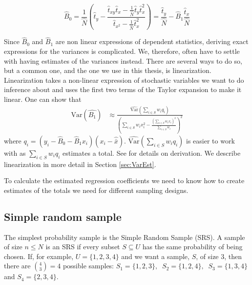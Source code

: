 \documentclass{article}
\begin{document}
\begin{equation*}
 \hat{B}_0 = \frac{1}{\widehat{N}} \left( \hat{t}_y - \frac{\hat{t}_{xy} \hat{t}_x - \frac{1}{\widehat{N}} \hat{t}_y \hat{t}_x^2}
   {\hat{t}_{x^2} - \frac{1}{\widehat{N}} \hat{t}_x^2}
 \right)
 = \frac{\hat{t}_y}{\hat{N}} - \hat{B}_1\frac{\hat{t}_x}{\hat{N}}
\end{equation*}

Since \(\hat{B}_0\) and \(\hat{B}_1\) are non linear expressions of dependent
statistics, deriving exact expressions for the variances is complicated. We, therefore,
often have to settle with having estimates of the variances instead.
There are several ways to do so, but a common one,
and the one we use in this thesis, is linearization. Linearization takes a
non-linear expression of stochastic variables we want to do inference about and uses
the first two terms of the Taylor expansion to make it linear.
One can show that
\begin{align*}
 \mathrm{Var}(\hat{B_1})
 &\approx \frac{\widehat{\mathrm{Var}}\left( \sum_{i \in S} w_i q_i \right)}
   {\left( \sum_{i \in S} w_i x_i^2 - \frac{\left( \sum_{i \in S} w_i x_i \right)^2}{\sum_{i \in S} w_i} \right)^2}
\end{align*}
where \(q_i = (y_i - \hat{B}_0 - \hat{B}_1 x_i)(x_i - \hat{\bar{x}})\).
\(\widehat{\mathrm{Var}}\left( \sum_{i \in S} w_i q_i \right)\) is easier to
work with as \(\sum_{i \in S} w_i q_i\) estimates a total. See \cite[Chapter
11.2.2]{sampReg} for details on derivation. We describe linearization in more
detail in Section \ref{sec:VarEst}.


To calculate the estimated regression coefficients we need to know how to create
estimates of the totals we need for different sampling designs.

\subsection{Simple random sample} \label{sec:SRS}

The simplest probability sample is the Simple Random Sample (SRS). A
sample of size \(n \leq N\) is an SRS if every subset \(S \subseteq U\) has the same
probability of being chosen.
If, for example, \(U = \{1, 2, 3, 4\}\) and we want a sample, \(S\), of
size \(3\), then there are \(\binom{4}{3} = 4\)  possible samples:
\( S_1 = \{1, 2, 3\},\ \)
\( S_2 = \{1, 2, 4\},\ \)
\( S_3 = \{1, 3, 4\}\ \) and
\( S_4 = \{2, 3, 4\} \).
\end{document}
